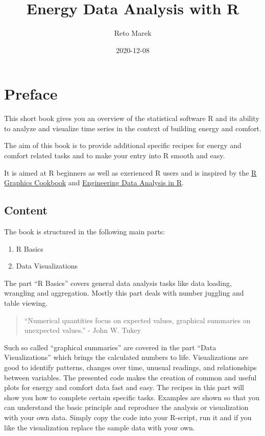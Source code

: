 \documentclass[
  a4paperpaper,
]{book}
\title{Energy Data Analysis with R}
\author{Reto Marek}
\date{2020-12-08}
\providecommand{\tightlist}{%
  \setlength{\itemsep}{0pt}\setlength{\parskip}{0pt}}
\begin{document}
\maketitle

{
\setcounter{tocdepth}{1}
\tableofcontents
}
\hypertarget{preface}{%
\chapter{Preface}\label{preface}}

This short book gives you an overview of the statistical software R and its ability to analyze and visualize time series in the context of building energy and comfort.

The aim of this book is to provide additional specific recipes for energy and comfort related tasks and to make your entry into R smooth and easy.

It is aimed at R beginners as well as exerienced R users and is inspired by the \href{https://r-graphics.org/}{R Graphics Cookbook} and \href{https://smogdr.github.io/edar_coursebook/}{Engineering Data Analysis in R}.

\hypertarget{content}{%
\section{Content}\label{content}}

The book is structured in the following main parts:

\begin{enumerate}
\def\labelenumi{\arabic{enumi}.}
\tightlist
\item
  R Basics
\item
  Data Visualizations
\end{enumerate}

The part ``R Basics'' covers general data analysis tasks like data loading, wrangling and aggregation. Mostly this part deals with number juggling and table viewing.

\begin{quote}
``Numerical quantities focus on expected values, graphical summaries on unexpected values.'' - John W. Tukey
\end{quote}

Such so called ``graphical summaries'' are covered in the part ``Data Visualizations'' which brings the calculated numbers to life. Visualizations are good to identify patterns, changes over time, unusual readings, and relationships between variables. The presented code makes the creation of common and useful plots for energy and comfort data fast and easy.
The recipes in this part will show you how to complete certain specific tasks. Examples are shown so that you can understand the basic principle and reproduce the analysis or visualization with your own data. Simply copy the code into your R-script, run it and if you like the visualization replace the sample data with your own.
\end{document}
